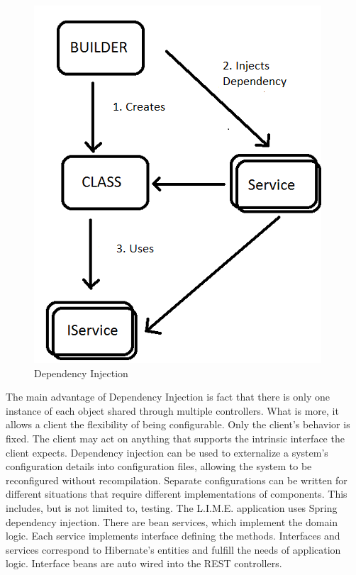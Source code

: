 \documentclass[a4paper,11pt,twoside]{report}
\theoremstyle{definition}
\begin{document}
\begin{figure}[h!]

\begin{center}

\includegraphics[scale = 1]{dependency}

\end{center}
\caption{Dependency Injection}
\end{figure}
The main advantage of Dependency Injection is fact that there is only one instance of each object shared through multiple controllers. What is more, it allows a client the flexibility of being configurable. Only the client's behavior is fixed. The client may act on anything that supports the intrinsic interface the client expects.
Dependency injection can be used to externalize a system's configuration details into configuration files, allowing the system to be reconfigured without recompilation. Separate configurations can be written for different situations that require different implementations of components. This includes, but is not limited to, testing. \cite{I}
The L.I.M.E. application uses Spring dependency injection. There are bean services, which implement the domain logic. Each service implements interface defining the methods. Interfaces and services correspond to Hibernate’s entities and fulfill the needs of application logic. Interface beans are auto wired into the REST controllers.
\end{document}
